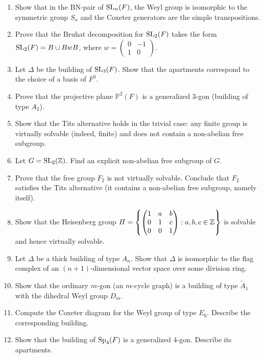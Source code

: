 \begin{enumerate}
    \item [I] Show that in the BN-pair of \(\operatorname{SL}_n(F)\), the Weyl group is isomorphic to the symmetric group \(S_n\) and the Coxeter generators are the simple transpositions.
    \item [B] Prove that the Bruhat decomposition for \(\operatorname{SL}_2(F)\) takes the form \(\operatorname{SL}_2(F) = B \cup B w B\), where \(w = \begin{pmatrix} 0 & -1 \\ 1 & 0 \end{pmatrix}\).
    \item [I] Let \(\Delta\) be the building of \(\operatorname{SL}_3(F)\). Show that the apartments correspond to the choice of a basis of \(F^3\).
    \item [I] Prove that the projective plane \(\mathbb{P}^2(F)\) is a generalized 3-gon (building of type \(A_2\)).
    \item [B] Show that the Tits alternative holds in the trivial case: any finite group is virtually solvable (indeed, finite) and does not contain a non-abelian free subgroup.
    \item [I] Let \(G = \operatorname{SL}_2(\mathbb{Z})\). Find an explicit non-abelian free subgroup of \(G\).
    \item [B] Prove that the free group \(F_2\) is not virtually solvable. Conclude that \(F_2\) satisfies the Tits alternative (it contains a non-abelian free subgroup, namely itself).
    \item [B] Show that the Heisenberg group \(H = \left\{ \begin{pmatrix} 1 & a & b \\ 0 & 1 & c \\ 0 & 0 & 1 \end{pmatrix} : a,b,c \in \mathbb{Z} \right\}\) is solvable and hence virtually solvable.
    \item [I] Let \(\Delta\) be a thick building of type \(A_n\). Show that \(\Delta\) is isomorphic to the flag complex of an \((n+1)\)-dimensional vector space over some division ring.
    \item [I] Show that the ordinary \(m\)-gon (an \(m\)-cycle graph) is a building of type \(\tilde{A}_1\) with the dihedral Weyl group \(D_m\).
    \item [I] Compute the Coxeter diagram for the Weyl group of type \(E_6\). Describe the corresponding building.
    \item [I] Show that the building of \(\operatorname{Sp}_4(F)\) is a generalized 4-gon. Describe its apartments.

\end{enumerate}
